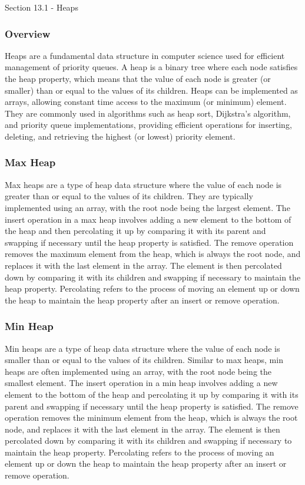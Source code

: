 \begin{notes}{Section 13.1 - Heaps}
    \subsubsection*{Overview}

    Heaps are a fundamental data structure in computer science used for efficient management of priority queues. A heap is a binary tree where each node satisfies the heap property, which means that the 
    value of each node is greater (or smaller) than or equal to the values of its children. Heaps can be implemented as arrays, allowing constant time access to the maximum (or minimum) element. They are 
    commonly used in algorithms such as heap sort, Dijkstra's algorithm, and priority queue implementations, providing efficient operations for inserting, deleting, and retrieving the highest (or lowest) 
    priority element.
    
    \subsubsection*{Max Heap}
    
    Max heaps are a type of heap data structure where the value of each node is greater than or equal to the values of its children. They are typically implemented using an array, with the root node being 
    the largest element. The insert operation in a max heap involves adding a new element to the bottom of the heap and then percolating it up by comparing it with its parent and swapping if necessary until 
    the heap property is satisfied. The remove operation removes the maximum element from the heap, which is always the root node, and replaces it with the last element in the array. The element is then 
    percolated down by comparing it with its children and swapping if necessary to maintain the heap property. Percolating refers to the process of moving an element up or down the heap to maintain the heap 
    property after an insert or remove operation.
    
    \subsubsection*{Min Heap}
    
    Min heaps are a type of heap data structure where the value of each node is smaller than or equal to the values of its children. Similar to max heaps, min heaps are often implemented using an array, with 
    the root node being the smallest element. The insert operation in a min heap involves adding a new element to the bottom of the heap and percolating it up by comparing it with its parent and swapping if 
    necessary until the heap property is satisfied. The remove operation removes the minimum element from the heap, which is always the root node, and replaces it with the last element in the array. The element 
    is then percolated down by comparing it with its children and swapping if necessary to maintain the heap property. Percolating refers to the process of moving an element up or down the heap to maintain the 
    heap property after an insert or remove operation.
\end{notes}

